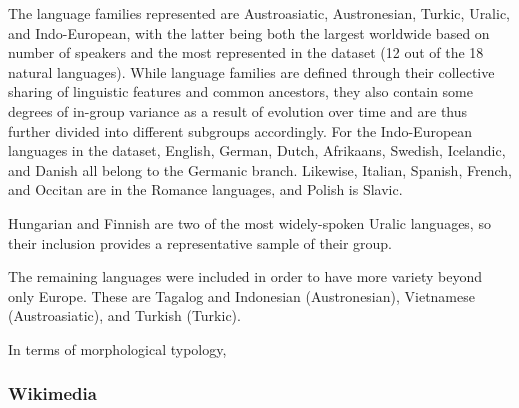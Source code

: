 \documentclass[12pt,a4paper]{article}
\numberwithin{figure}{section}
\numberwithin{table}{section}
\numberwithin{definition}{section}
\begin{document}
The language families represented are Austroasiatic, Austronesian, Turkic, Uralic, and Indo-European, with the latter being both the largest worldwide based on number of speakers and the most represented in the dataset (12 out of the 18 natural languages). While language families are defined through their collective sharing of linguistic features and common ancestors, they also contain some degrees of in-group variance as a result of evolution over time and are thus further divided into different subgroups accordingly. For the Indo-European languages in the dataset, English, German, Dutch, Afrikaans, Swedish, Icelandic, and Danish all belong to the Germanic branch. Likewise, Italian, Spanish, French, and Occitan are in the Romance languages, and Polish is Slavic.

Hungarian and Finnish are two of the most widely-spoken Uralic languages, so their inclusion provides a representative sample of their group.

The remaining languages were included in order to have more variety beyond only Europe. These are Tagalog and Indonesian (Austronesian), Vietnamese (Austroasiatic), and Turkish (Turkic). 

In terms of morphological typology, 


\subsubsection{Wikimedia}
\label{ssec:wikimedia}

\end{document}
